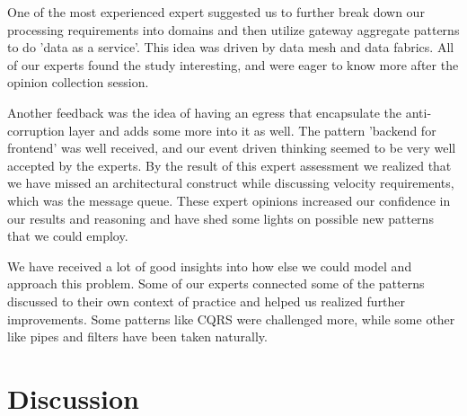 \documentclass{bmcart}
\begin{document}
One of the most experienced expert suggested us to further break down our processing requirements into domains and then utilize gateway aggregate patterns to do 'data as a service'. This idea was driven by data mesh and data fabrics. All of our experts found the study interesting, and were eager to know more after the opinion collection session. 

Another feedback was the idea of having an egress that encapsulate the anti-corruption layer and adds some more into it as well. The pattern 'backend for frontend' was well received, and our event driven thinking seemed to be very well accepted by the experts. By the result of this expert assessment we realized that we have missed an architectural construct while discussing velocity requirements, which was the message queue. These expert opinions increased our confidence in our results and reasoning and have shed some lights on possible new patterns that we could employ.

We have received a lot of good insights into how else we could model and approach this problem. Some of our experts connected some of the patterns discussed to their own context of practice and helped us realized further improvements. Some patterns like CQRS were challenged more, while some other like pipes and filters have been taken naturally. 

\section{Discussion}


\end{document}
